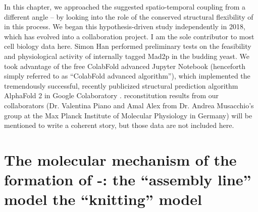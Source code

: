 In this chapter, we approached the suggested spatio-temporal coupling from a different angle -- by looking into the role of the conserved structural flexibility of  in this process. We began this hypothesis-driven study independently in 2018, which has evolved into a collaboration project. I am the sole contributor to most cell biology data here. Simon Han performed preliminary tests on the feasibility and physiological activity of internally tagged Mad2p in the budding yeast. We took advantage of the free ColabFold advanced Jupyter Notebook (henceforth simply referred to as ``ColabFold advanced algorithm''), which implemented the tremendously successful, recently publicized structural prediction algorithm AlphaFold 2 in Google Colaboratory \cite{ColabFold, AlphaFold}.  reconstitution results from our collaborators (Dr. Valentina Piano and Amal Alex from Dr. Andrea Musacchio's group at the Max Planck Institute of Molecular Physiology in Germany) will be mentioned to write a coherent story, but those data are not included here.

\section{The molecular mechanism of the formation of -: the ``assembly line'' model  the ``knitting'' model}
\label{TwoModels}

